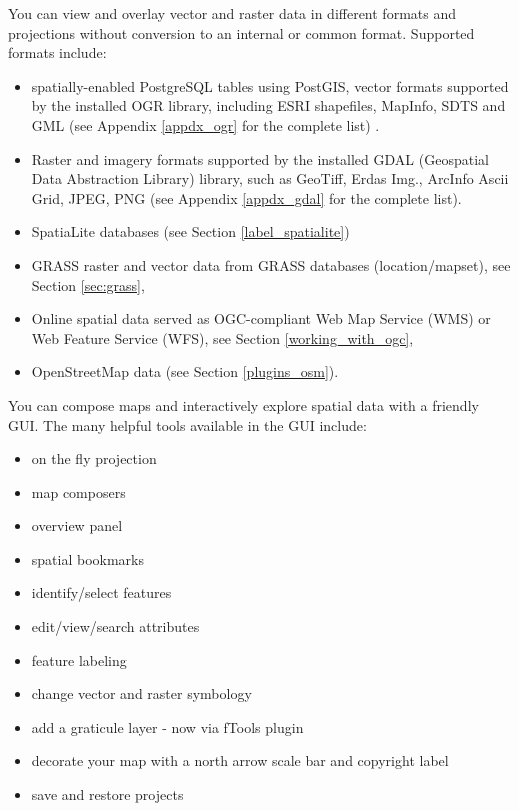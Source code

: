 
You can view and overlay vector and raster data in different formats and
projections without conversion to an internal or common format. Supported
formats include:

\begin{itemize}[label=--]
\item spatially-enabled PostgreSQL tables using PostGIS, vector 
formats
 supported by the installed OGR library, including ESRI shapefiles, MapInfo, 
SDTS and GML (see Appendix \ref{appdx_ogr} for the complete list) .
\item Raster and imagery formats supported by the installed GDAL (Geospatial
Data Abstraction Library) library, such as GeoTiff, Erdas Img., ArcInfo Ascii 
Grid, JPEG, PNG (see Appendix \ref{appdx_gdal} for the complete list).
\item SpatiaLite databases (see Section \ref{label_spatialite}) 
\item GRASS raster and vector data from GRASS databases (location/mapset),
see Section \ref{sec:grass}, 
\item Online spatial data served as OGC-compliant Web Map Service (WMS) or
Web Feature Service (WFS), see Section \ref{working_with_ogc},
\item OpenStreetMap data (see Section \ref{plugins_osm}).
\end{itemize}


You can compose maps and interactively explore spatial data with a friendly
GUI. The many helpful tools available in the GUI include:

\begin{itemize}[label=--]
\item on the fly projection
\item map composers
\item overview panel
\item spatial bookmarks
\item identify/select features
\item edit/view/search attributes
\item feature labeling
\item change vector and raster symbology
\item add a graticule layer - now via fTools plugin
\item decorate your map with a north arrow scale bar and copyright label
\item save and restore projects
\end{itemize}

